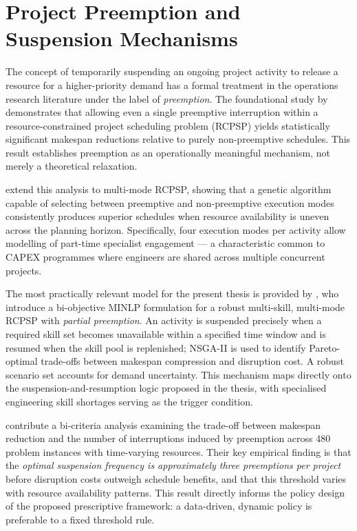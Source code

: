 \section{Project Preemption and Suspension Mechanisms}
\label{sec:lit_preemption}

The concept of temporarily suspending an ongoing project activity to release a resource for
a higher-priority demand has a formal treatment in the operations research literature under
the label of \textit{preemption}. The foundational study by \textcite{ballestin2008preemption}
demonstrates that allowing even a single preemptive interruption within a resource-constrained
project scheduling problem (RCPSP) yields statistically significant makespan reductions
relative to purely non-preemptive schedules. This result establishes preemption as an
operationally meaningful mechanism, not merely a theoretical relaxation.

\textcite{vanpeteghem2010genetic} extend this analysis to multi-mode RCPSP, showing that a
genetic algorithm capable of selecting between preemptive and non-preemptive execution modes
consistently produces superior schedules when resource availability is uneven across the
planning horizon. Specifically, four execution modes per activity allow modelling of
part-time specialist engagement — a characteristic common to CAPEX programmes where engineers
are shared across multiple concurrent projects.

The most practically relevant model for the present thesis is provided by
\textcite{hatamimoghaddam2024robust}, who introduce a bi-objective MINLP formulation for a
robust multi-skill, multi-mode RCPSP with \textit{partial preemption}. An activity is
suspended precisely when a required skill set becomes unavailable within a specified time
window and is resumed when the skill pool is replenished; NSGA-II is used to identify
Pareto-optimal trade-offs between makespan compression and disruption cost. A robust scenario
set accounts for demand uncertainty. This mechanism maps directly onto the
suspension-and-resumption logic proposed in the thesis, with specialised engineering skill
shortages serving as the trigger condition.

\textcite{vanhoucke2025impact} contribute a bi-criteria analysis examining the trade-off between
makespan reduction and the number of interruptions induced by preemption across 480 problem
instances with time-varying resources. Their key empirical finding is that the
\textit{optimal suspension frequency is approximately three preemptions per project} before
disruption costs outweigh schedule benefits, and that this threshold varies with resource
availability patterns. This result directly informs the policy design of the proposed
prescriptive framework: a data-driven, dynamic policy is preferable to a fixed threshold rule.

